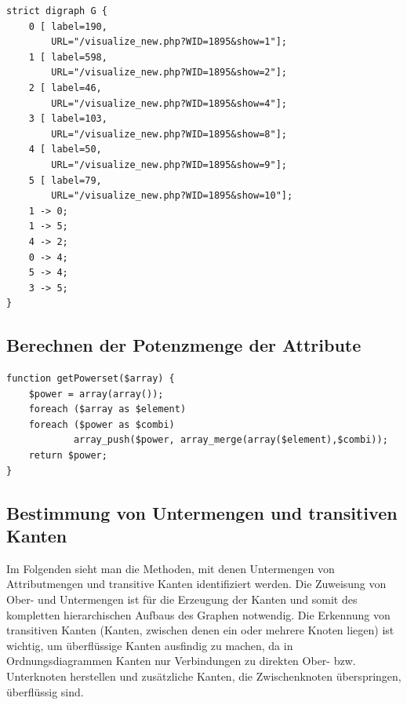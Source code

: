 \documentclass[pagesize,paper=A4,DIV=calc,fontsize=12pt,draft=false]{scrreprt}
\begin{document}
\lstset{
language=C
}

\begin{lstlisting}[caption={DOT-Syntax für Ordnungsdiagramm des Begriffsverbands für das Synset \emph{Macula}. Vereinfachte Darstellung.}]
strict digraph G {
    0 [ label=190, 
        URL="/visualize_new.php?WID=1895&show=1"];
    1 [ label=598, 
        URL="/visualize_new.php?WID=1895&show=2"];
    2 [ label=46, 
        URL="/visualize_new.php?WID=1895&show=4"];
    3 [ label=103, 
        URL="/visualize_new.php?WID=1895&show=8"];
    4 [ label=50, 
        URL="/visualize_new.php?WID=1895&show=9"];
    5 [ label=79, 
        URL="/visualize_new.php?WID=1895&show=10"];
    1 -> 0;
    1 -> 5;
    4 -> 2;
    0 -> 4;
    5 -> 4;
    3 -> 5;
}
\end{lstlisting}

\subsection{Berechnen der Potenzmenge der Attribute}


\lstset{
language=PHP
}

\begin{lstlisting}[caption={Funktion zum Berechnen der Potenzmenge der Attribute, mit der die Graphstruktur aufgebaut wird.}]
function getPowerset($array) {
    $power = array(array());
    foreach ($array as $element)
    foreach ($power as $combi)
            array_push($power, array_merge(array($element),$combi));
    return $power;
}
\end{lstlisting}

\subsection{Bestimmung von Untermengen und transitiven Kanten}

Im Folgenden sieht man die Methoden, mit denen Untermengen von Attributmengen und transitive Kanten identifiziert werden. Die Zuweisung von Ober- und Untermengen ist für die Erzeugung der Kanten und somit des kompletten hierarchischen Aufbaus des Graphen notwendig. Die Erkennung von transitiven Kanten (Kanten, zwischen denen ein oder mehrere Knoten liegen) ist wichtig, um überflüssige Kanten ausfindig zu machen, da in Ordnungsdiagrammen Kanten nur Verbindungen zu direkten Ober- bzw. Unterknoten herstellen und zusätzliche Kanten, die Zwischenknoten überspringen, überflüssig sind.

\lstset{
language=PHP
}
\end{document}
